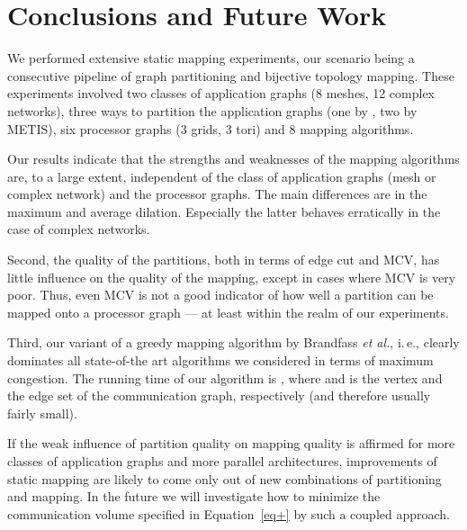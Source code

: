 \documentclass[pdftex]{llncs}
\newcommand{\ie}{i.\,e.\xspace}
\newcommand{\etal}{\textit{et al.}\xspace}
\newcommand{\metis}{\textsc{METIS}\xspace}
\begin{document}
\FloatBarrier


\section{Conclusions and Future Work}
\label{sec:conclusions}
We performed extensive static mapping experiments, our scenario being
a consecutive pipeline of graph partitioning and bijective topology mapping.
These experiments involved  two classes of application
graphs (8 meshes, 12 complex networks), three ways to partition the
application graphs (one by , two by \metis), six
processor graphs (3 grids, 3 tori) and 8 mapping algorithms.

Our results indicate that the strengths and weaknesses of the mapping algorithms are, to
a large extent, independent of the class of application graphs (mesh
or complex network) and the processor graphs. The main differences are
in the maximum and average dilation. Especially the latter behaves
erratically in the case of complex networks.

Second, the quality of the partitions, both in terms of edge cut and
MCV, has little influence on the quality of the mapping, except in
cases where MCV is very poor. Thus, even MCV is not a good indicator
of how well a partition can be mapped onto a processor graph --- at
least within the realm of our experiments.

Third, our variant of a greedy mapping algorithm by Brandfass \etal,
\ie , clearly dominates all state-of-the art algorithms we considered
in terms of maximum congestion. The running time of our algorithm is , where  and  is the vertex and the
edge set of the communication graph, respectively (and therefore usually fairly small).

If the weak influence of partition quality on mapping quality is
affirmed for more classes of application graphs and more parallel
architectures, improvements of static mapping
are likely to come only out of new combinations of
partitioning and mapping. In the future we will investigate how 
to minimize the communication volume specified in Equation~\ref{eq+}
by such a coupled approach.





\end{document}
